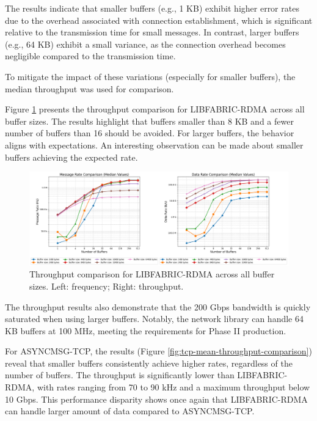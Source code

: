 The results indicate that smaller buffers (e.g., 1 KB) exhibit higher error rates due to the overhead associated with connection establishment, which is significant relative to the transmission time for small messages. In contrast, larger buffers (e.g., 64 KB) exhibit a small variance, as the connection overhead becomes negligible compared to the transmission time.

To mitigate the impact of these variations (especially for smaller buffers), the median throughput was used for comparison.

Figure \ref{fig:libfabric-mean-throughput-comparison} presents the throughput comparison for LIBFABRIC-RDMA across all buffer sizes. The results highlight that buffers smaller than 8 KB and a fewer number of buffers than 16 should be avoided. For larger buffers, the behavior aligns with expectations. 
An interesting observation can be made about smaller buffers achieving the expected rate.

\begin{figure}[htbp]
\centering
\includegraphics[width=\textwidth]{images/results/libfabric_performance_comparison.png}
\caption{Throughput comparison for LIBFABRIC-RDMA across all buffer sizes. Left: frequency; Right: throughput.}
\label{fig:libfabric-mean-throughput-comparison}
\end{figure}

The throughput results also demonstrate that the 200 Gbps bandwidth is quickly saturated when using larger buffers. Notably, the network library can handle 64 KB buffers at 100 MHz, meeting the requirements for Phase II production.

For ASYNCMSG-TCP, the results (Figure \ref{fig:tcp-mean-throughput-comparison}) reveal that smaller buffers consistently achieve higher rates, regardless of the number of buffers. The throughput is significantly lower than LIBFABRIC-RDMA, with rates ranging from 70 to 90 kHz and a maximum throughput below 10 Gbps. This performance disparity shows once again that LIBFABRIC-RDMA can handle larger amount of data compared to ASYNCMSG-TCP.

